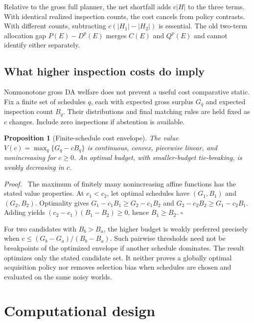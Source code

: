 \documentclass[11pt,a4paper]{article}
\newtheorem{proposition}{Proposition}
\newenvironment{proof}{\par\noindent\textit{Proof.}\ }{\hfill$\square$\par}
\begin{document}
Relative to the gross full planner, the net shortfall adds $c|H|$ to the three terms. With identical realized inspection counts, the cost cancels from policy contrasts. With different counts, subtracting $c(|H_1|-|H_2|)$ is essential. The old two-term allocation gap $P(E)-D^p(E)$ merges $C(E)$ and $Q^p(E)$ and cannot identify either separately.

\subsection{What higher inspection costs do imply}
Nonmonotone gross DA welfare does not prevent a useful cost comparative static. Fix a finite set of schedules $q$, each with expected gross surplus $G_q$ and expected inspection count $B_q$. Their distributions and final matching rules are held fixed as $c$ changes. Include zero inspections if abstention is available.

\begin{proposition}[Finite-schedule cost envelope]\label{prop:cost}
The value $V(c)=\max_q\{G_q-cB_q\}$ is continuous, convex, piecewise linear, and nonincreasing for $c\ge0$. An optimal budget, with smaller-budget tie-breaking, is weakly decreasing in $c$.
\end{proposition}
\begin{proof}
The maximum of finitely many nonincreasing affine functions has the stated value properties. At $c_1<c_2$, let optimal schedules have $(G_1,B_1)$ and $(G_2,B_2)$. Optimality gives $G_1-c_1B_1\ge G_2-c_1B_2$ and $G_2-c_2B_2\ge G_1-c_2B_1$. Adding yields $(c_2-c_1)(B_1-B_2)\ge0$, hence $B_1\ge B_2$.
\end{proof}

For two candidates with $B_b>B_a$, the higher budget is weakly preferred precisely when $c\le(G_b-G_a)/(B_b-B_a)$. Such pairwise thresholds need not be breakpoints of the optimized envelope if another schedule dominates. The result optimizes only the stated candidate set. It neither proves a globally optimal acquisition policy nor removes selection bias when schedules are chosen and evaluated on the same noisy worlds.

\section{Computational design}\label{sec:design}
\end{document}
